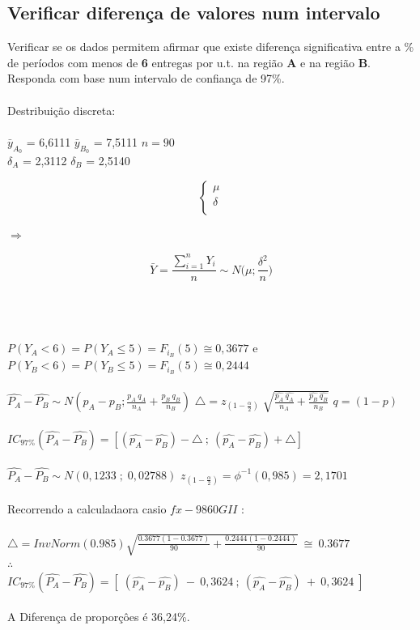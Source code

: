 \subsection{Verificar diferença de valores num intervalo}
\noindent
Verificar se os dados permitem afirmar que existe diferença significativa entre a \% de períodos com menos de \textbf{6} entregas por u.t. na região \textbf{A} e na região \textbf{B}. Responda com base num intervalo de confiança de 97\%. \\
\\
Destribuição discreta: \\
\\
$\bar{y}_{A_0}$ = 6,6111 \qquad $\bar{y}_{B_0}$ = 7,5111 \qquad $n=90$ \\
$\delta_A$ = 2,3112 \qquad $\delta_B$ = 2,5140 \\
\begin{minipage}[l]{0pt}
$$\left\lbrace\begin{array}{c}
\mu \\
\delta \\
\end{array}\right.$$
\end{minipage}
\hspace{3cm} $\Longrightarrow$ \hspace{3cm}
\begin{minipage}[l]{0pt}
\[\bar{Y}=\frac{\sum_{i=1}^nY_i}{n}\sim N \big(\mu;\frac{\delta^2}{n}\big)\]
\end{minipage}\\
\\
\\
$P(Y_A < 6)=P(Y_A \leqslant 5)=F_{i_B}(5) \cong 0,3677 $  \quad e \quad $P(Y_B < 6)=P(Y_B \leqslant 5)=F_{i_B}(5) \cong 0,2444$ \\
\\
$\hat{P_A}-\hat{P_B} \sim N \left( p_A - p_B ; \frac{p_A\:q_A}{n_A} + \frac{p_B\:q_B}{n_B}\right)$ \hspace{1cm}
$\triangle=z_{(1-\frac{\alpha}{2})} \;\sqrt{\frac{\hat{p_A} \: \hat{q_A}}{n_A}+\frac{\hat{p_B} \: \hat{q_B}}{n_B}}$ \hspace{1cm} $q=(1-p)$ \\
\\
$IC_{97\%}(\hat{P_A}-\hat{P_B})=\left[(\hat{p_A}-\hat{p_B})-\triangle \: ; \: (\hat{p_A}-\hat{p_B})+\triangle \right]$ \\
\\
$\hat{P_A}-\hat{P_B} \sim N \left( 0,1233 \; ; \; 0,02788\right)$ \hspace{1cm}
$z_{(1-\frac{\alpha}{2})}=\phi^{-1}(0,985)=2,1701$ \\
\\
Recorrendo a calculadaora casio $fx-9860GII$ : \\
\\
$\triangle= InvNorm(0.985)\sqrt{\frac{0.3677(1-0.3677)}{90}+\frac{0.2444(1-0.2444)}{90}}\: \cong \:0.3677$
\\
$\therefore$
\\
$IC_{97\%}(\hat{P_A}-\hat{P_B})=\left[ \; (\hat{p_A}-\hat{p_B}) \:-\: 0,3624 \: ; \: (\hat{p_A}-\hat{p_B}) \:+\: 0,3624 \; \right]$ \\
\\
A Diferença de proporçôes é 36,24\%. \\
